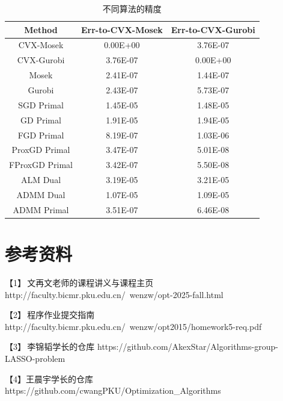 \documentclass[a4paper,12pt]{ctexart}
\begin{document}
		\begin{table}[h!]
			\begin{center}
				\caption{不同算法的精度}
				\label{table.2}
				\begin{tabular}{c|c|c}
					\textbf{Method} & \textbf{Err-to-CVX-Mosek} & \textbf{Err-to-CVX-Gurobi}\\
					\hline
					CVX-Mosek & 0.00E+00 & 3.76E-07 \\
					CVX-Gurobi & 3.76E-07 & 0.00E+00 \\
					Mosek & 2.41E-07 & 1.44E-07  \\
					Gurobi & 2.43E-07 & 5.73E-07 \\
					SGD Primal & 1.45E-05 & 1.48E-05 \\
					GD Primal & 1.91E-05 & 1.94E-05 \\
					FGD Primal & 8.19E-07 & 1.03E-06 \\
					ProxGD Primal & 3.47E-07 & 5.01E-08 \\
					FProxGD Primal & 3.42E-07 & 5.50E-08 \\
					ALM Dual & 3.19E-05 & 3.21E-05 \\
					ADMM Dual & 1.07E-05 & 1.09E-05 \\
					ADMM Primal & 3.51E-07 & 6.46E-08 \\			
				\end{tabular}
			\end{center}
		\end{table}
	\section{参考资料}
	【1】\,文再文老师的课程讲义与课程主页
	http://faculty.bicmr.pku.edu.cn/~wenzw/opt-2025-fall.html
	
	【2】\,程序作业提交指南 http://faculty.bicmr.pku.edu.cn/~wenzw/opt2015/homework5-req.pdf
	
	【3】\,李锦韬学长的仓库
	https://github.com/AkexStar/Algorithms-group-LASSO-problem
	
	【4】王晨宇学长的仓库
	https://github.com/cwangPKU/Optimization\_Algorithms
\end{document}
